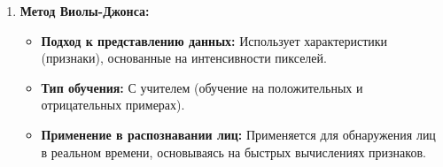 \begin{enumerate}
    \item\textbf{Метод Виолы-Джонса:}
    \begin{itemize}
        \item \textbf{Подход к представлению данных:} Использует характеристики (признаки), основанные на интенсивности пикселей.
        \item \textbf{Тип обучения:} С учителем (обучение на положительных и отрицательных примерах).
        \item \textbf{Применение в распознавании лиц:} Применяется для обнаружения лиц в реальном времени, основываясь на быстрых вычислениях признаков.
    \end{itemize}
    
\end{enumerate}